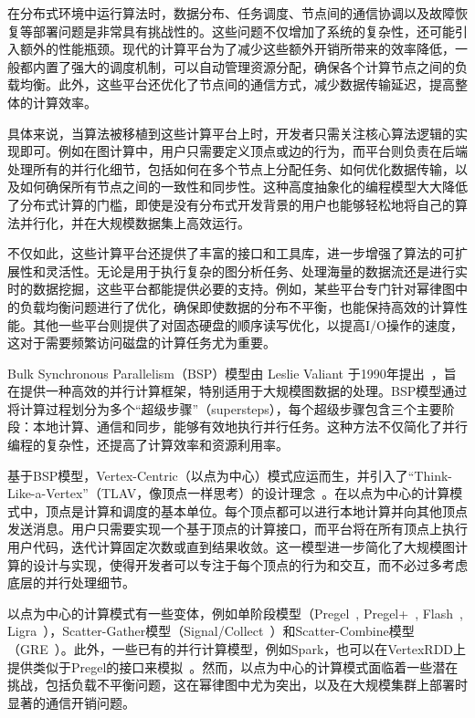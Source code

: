 在分布式环境中运行算法时，数据分布、任务调度、节点间的通信协调以及故障恢复等部署问题是非常具有挑战性的。这些问题不仅增加了系统的复杂性，还可能引入额外的性能瓶颈。现代的计算平台为了减少这些额外开销所带来的效率降低，一般都内置了强大的调度机制，可以自动管理资源分配，确保各个计算节点之间的负载均衡。此外，这些平台还优化了节点间的通信方式，减少数据传输延迟，提高整体的计算效率。

具体来说，当算法被移植到这些计算平台上时，开发者只需关注核心算法逻辑的实现即可。例如在图计算中，用户只需要定义顶点或边的行为，而平台则负责在后端处理所有的并行化细节，包括如何在多个节点上分配任务、如何优化数据传输，以及如何确保所有节点之间的一致性和同步性。这种高度抽象化的编程模型大大降低了分布式计算的门槛，即使是没有分布式开发背景的用户也能够轻松地将自己的算法并行化，并在大规模数据集上高效运行。

不仅如此，这些计算平台还提供了丰富的接口和工具库，进一步增强了算法的可扩展性和灵活性。无论是用于执行复杂的图分析任务、处理海量的数据流还是进行实时的数据挖掘，这些平台都能提供必要的支持。例如，某些平台专门针对幂律图中的负载均衡问题进行了优化，确保即使数据的分布不平衡，也能保持高效的计算性能。其他一些平台则提供了对固态硬盘的顺序读写优化，以提高I/O操作的速度，这对于需要频繁访问磁盘的计算任务尤为重要。

Bulk Synchronous Parallelism（BSP）模型由 Leslie Valiant 于1990年提出~\cite{valiant1990bridging}，旨在提供一种高效的并行计算框架，特别适用于大规模图数据的处理。BSP模型通过将计算过程划分为多个“超级步骤”（supersteps），每个超级步骤包含三个主要阶段：本地计算、通信和同步，能够有效地执行并行任务。这种方法不仅简化了并行编程的复杂性，还提高了计算效率和资源利用率。

基于BSP模型，Vertex-Centric（以点为中心）模式应运而生，并引入了“Think-Like-a-Vertex”（TLAV，像顶点一样思考）的设计理念~\cite{mccune2015thinking}。在以点为中心的计算模式中，顶点是计算和调度的基本单位。每个顶点都可以进行本地计算并向其他顶点发送消息。用户只需要实现一个基于顶点的计算接口，而平台将在所有顶点上执行用户代码，迭代计算固定次数或直到结果收敛。这一模型进一步简化了大规模图计算的设计与实现，使得开发者可以专注于每个顶点的行为和交互，而不必过多考虑底层的并行处理细节。

以点为中心的计算模式有一些变体，例如单阶段模型（Pregel~\cite{malewicz2010pregel}, Pregel+~\cite{yan2015effective}, Flash~\cite{10184838}, Ligra~\cite{DBLP:conf/ppopp/ShunB13}），Scatter-Gather模型（Signal/Collect~\cite{stutz2010signal}）和Scatter-Combine模型（GRE~\cite{yan2014pregel}）。此外，一些已有的并行计算模型，例如Spark，也可以在VertexRDD上提供类似于Pregel的接口来模拟~\cite{gonzalez2014graphx}。然而，以点为中心的计算模式面临着一些潜在挑战，包括负载不平衡问题，这在幂律图中尤为突出，以及在大规模集群上部署时显著的通信开销问题。


